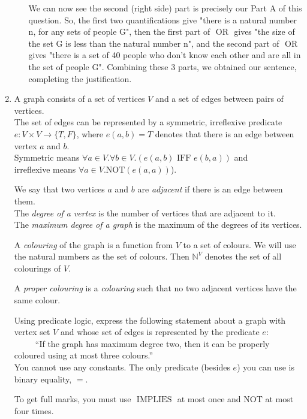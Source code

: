 \documentclass[12pt]{article}
\newcommand{\nnot}{\mathrm{NOT}}
\newcommand{\oor}{\,\,\mathrm{OR}\,\,}
\newcommand{\iimplies}{\,\,\mathrm{IMPLIES}\,\,}
\newcommand{\iif}{\,\,\mathrm{IFF}\,\,}
\newcommand{\nats}{\mathbb{N}}
\begin{document}
\begin{enumerate}
\begin{enumerate}
We can now see the second (right side) part is precisely our Part A of this question. So, the first two quantifications give "there is a natural number n, for any sets of people G", then the first part of $\oor$ gives "the size of the set G is less than the natural number n", and the second part of $\oor$ gives "there is a set of 40 people who don't know each other and are all in the set of people G". Combining these 3 parts, we obtained our sentence, completing the justification. 
 

\end{enumerate}



\item
A graph consists of a set of vertices  $V$ and a set of edges between pairs of vertices.\\
The set of edges can be represented by a symmetric, irreflexive predicate $e: V \times V \to \{T,F\}$, where $e(a,b) = T$ denotes that there is an edge between vertex $a$ and $b$.\\
Symmetric means  $\forall a \in V. \forall b \in V. (e(a,b) \iif e(b,a))$ and\\
irreflexive means  $\forall a \in V.\nnot (e(a,a))$).

We say that two vertices $a$ and $b$ are \emph{adjacent} if there is an edge between them.\\
The \emph{degree of a vertex}  is the number of vertices that are adjacent to it.\\
The \emph{maximum degree of a graph} is the maximum of the degrees of its vertices.

A \emph{colouring} of the graph is a function from $V$ to a set of colours. We will use the natural numbers
 as the set of colours. Then $\nats^V$ denotes the set of all colourings of $V$.

A \textit{proper colouring} is a \textit{colouring} such that no two adjacent vertices have the same colour.


Using predicate logic, express the following statement  about a graph with vertex set $V$ and whose set of edges is represented by the predicate $e$:\\
\ \ \ \ \ ``If the graph has maximum degree two, then it can be properly coloured using at most three colours.''\\
You cannot use any constants. 
The only predicate (besides $e$) you can use is binary equality, $=$.

To get full marks, you must use $\iimplies$ at most once and $\nnot$ at most four times.


\end{enumerate}
\end{document}
